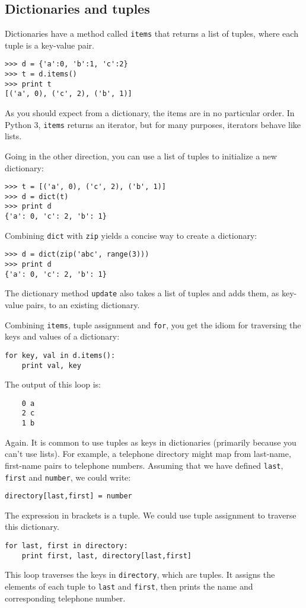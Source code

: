 \documentclass{article}
\begin{document}
\subsection{Dictionaries and tuples}
Dictionaries have a method called \verb|items| that returns a list of tuples,
where each tuple is a key-value pair.
\begin{verbatim}
>>> d = {'a':0, 'b':1, 'c':2}
>>> t = d.items()
>>> print t
[('a', 0), ('c', 2), ('b', 1)]
\end{verbatim}
As you should expect from a dictionary, the items are in no particular
order. In Python 3, \verb|items| returns an iterator, but for many purposes,
iterators behave like lists.

Going in the other direction, you can use a list of tuples to
initialize a new dictionary:
\begin{verbatim}
>>> t = [('a', 0), ('c', 2), ('b', 1)]
>>> d = dict(t)
>>> print d
{'a': 0, 'c': 2, 'b': 1}
\end{verbatim}
Combining \verb|dict| with \verb|zip| yields a concise way to create a
dictionary:
\begin{verbatim}
>>> d = dict(zip('abc', range(3)))
>>> print d
{'a': 0, 'c': 2, 'b': 1}
\end{verbatim}
The dictionary method \verb|update| also takes a list of tuples and adds
them, as key-value pairs, to an existing dictionary.

Combining \verb|items|, tuple assignment and \verb|for|,
you get the idiom for traversing the keys and values of a dictionary:
\begin{verbatim}
for key, val in d.items():
    print val, key
\end{verbatim}
The output of this loop is:
\begin{verbatim}
    0 a
    2 c
    1 b
\end{verbatim}
Again.
It is common to use tuples as keys in dictionaries (primarily
because you can’t use lists). For example, a telephone directory
might map from last-name, first-name pairs to telephone numbers.
Assuming that we have defined \verb|last|, \verb|first| and
\verb|number|, we could write:
\begin{verbatim}
directory[last,first] = number
\end{verbatim}
The expression in brackets is a tuple. We could use tuple assignment
to traverse this dictionary.
\begin{verbatim}
for last, first in directory:
    print first, last, directory[last,first]
\end{verbatim}
This loop traverses the keys in \verb|directory|, which are tuples. It
assigns the elements of each tuple to \verb|last| and \verb|first|,
then prints the name and corresponding telephone number.
\end{document}
